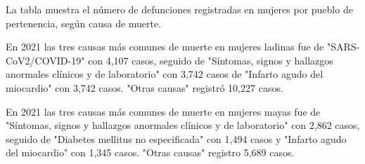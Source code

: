 La tabla muestra el número de defunciones registradas en mujeres por pueblo de pertenencia, según causa de muerte. 

En 2021 las tres causas más comunes de muerte en mujeres ladinas fue de "SARS-CoV2/COVID-19" con 4,107 casos, seguido de 	"Síntomas, signos y hallazgos anormales clínicos y de laboratorio" con 3,742 casos de "Infarto agudo del miocardio" con 3,742 casos. "Otras causas" registró 10,227 casos. 

En 2021 las tres causas más comunes de muerte en mujeres mayas fue de "Síntomas, signos y hallazgos anormales clínicos y de laboratorio" con 2,862 casos, seguido de "Diabetes mellitus no especificada" con 1,494 casos y "Infarto agudo del miocardio" con 1,345 casos. "Otras causas" registro 5,689 casos.